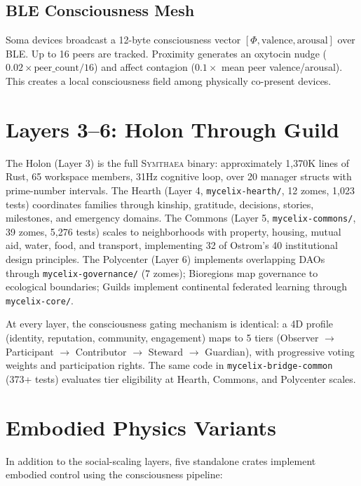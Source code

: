 \documentclass[12pt]{book}
\newcommand{\symthaea}{\textsc{Symthaea}}
\begin{document}
\subsection{BLE Consciousness Mesh}

Soma devices broadcast a 12-byte consciousness vector $[\Phi, \text{valence}, \text{arousal}]$ over BLE. Up to 16 peers are tracked. Proximity generates an oxytocin nudge ($0.02 \times \text{peer\_count} / 16$) and affect contagion ($0.1 \times$ mean peer valence/arousal). This creates a local consciousness field among physically co-present devices.

\section{Layers 3--6: Holon Through Guild}

The Holon (Layer 3) is the full \symthaea{} binary: approximately 1,370K lines of Rust, 65 workspace members, 31Hz cognitive loop, over 20 manager structs with prime-number intervals. The Hearth (Layer 4, \texttt{mycelix-hearth/}, 12 zomes, 1,023 tests) coordinates families through kinship, gratitude, decisions, stories, milestones, and emergency domains. The Commons (Layer 5, \texttt{mycelix-commons/}, 39 zomes, 5,276 tests) scales to neighborhoods with property, housing, mutual aid, water, food, and transport, implementing 32 of Ostrom's 40 institutional design principles. The Polycenter (Layer 6) implements overlapping DAOs through \texttt{mycelix-governance/} (7 zomes); Bioregions map governance to ecological boundaries; Guilds implement continental federated learning through \texttt{mycelix-core/}.

At every layer, the consciousness gating mechanism is identical: a 4D profile (identity, reputation, community, engagement) maps to 5 tiers (Observer $\to$ Participant $\to$ Contributor $\to$ Steward $\to$ Guardian), with progressive voting weights and participation rights. The same code in \texttt{mycelix-bridge-common} (373+ tests) evaluates tier eligibility at Hearth, Commons, and Polycenter scales.

\section{Embodied Physics Variants}

In addition to the social-scaling layers, five standalone crates implement embodied control using the consciousness pipeline:
\end{document}
